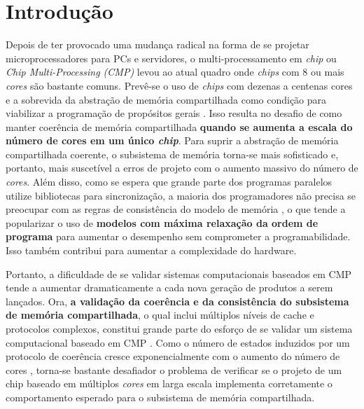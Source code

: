 \documentclass{ufsc-thesis}
\begin{document}
\afterpage{\null\newpage}

\begin{KeepFromToc}
    \tableofcontents
\end{KeepFromToc}

\chapter{Introdução}

Depois de ter provocado uma mudança radical na forma de se projetar
microprocessadores para PCs e servidores, o multi-processamento em
\textit{chip} ou \textit{Chip Multi-Processing (CMP)} levou ao atual quadro
onde \textit{chips} com 8 ou mais \textit{cores} são bastante comuns. Prevê-se
o uso de \textit{chips} com dezenas a centenas cores e a sobrevida da abstração
de memória compartilhada como condição para viabilizar a programação de
propósitos gerais \cite{Devadas:2013}. Isso resulta no desafio de como manter
coerência de memória compartilhada \textbf{quando se aumenta a escala do número
de cores em um único \textit{chip}}. Para suprir a abstração de memória
compartilhada coerente, o subsistema de memória torna-se mais sofisticado e,
portanto, mais suscetível a erros de projeto com o aumento massivo do número de
\textit{cores}. Além disso, como se espera que grande parte dos programas
paralelos utilize bibliotecas para sincronização, a maioria dos programadores
não precisa se preocupar com as regras de consistência \cite{Adve:1996} do
modelo de memória \cite{Hennessy:2011}, o que tende a popularizar o uso de
\textbf{modelos com máxima relaxação da ordem de programa} para aumentar o
desempenho sem comprometer a programabilidade.  Isso também contribui para
aumentar a complexidade do hardware.

Portanto, a dificuldade de se validar sistemas computacionais baseados em CMP
tende a aumentar dramaticamente a cada nova geração de produtos a serem
lançados. Ora, \textbf{a validação da coerência e da consistência do subsistema
de memória compartilhada}, o qual inclui múltiplos níveis de cache e protocolos
complexos, constitui grande parte do esforço de se validar um sistema
computacional baseado em CMP \cite{Wagner:2008}. Como o número de estados
induzidos por um protocolo de coerência cresce exponencialmente com o aumento
do número de cores \cite{Shim:2013}, torna-se bastante desafiador o problema de
verificar se o projeto de um chip baseado em múltiplos \textit{cores} em larga
escala implementa corretamente o comportamento esperado para o subsistema de
memória compartilhada.
\end{document}
